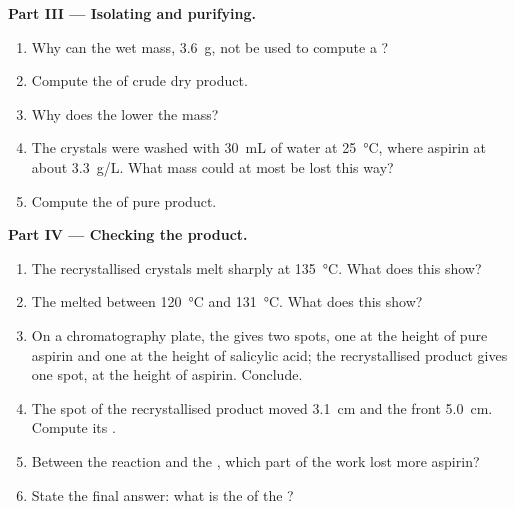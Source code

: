 \begin{problem}
\medskip
\noindent\textbf{Part III --- Isolating and purifying.}
\begin{enumerate}[resume]
  \item Why can the wet mass, \qty{3.6}{g}, not be used to compute a
        ?
  \item Compute the  of crude dry product.
  \item Why does the  lower the mass?
  \item The crystals were washed with \qty{30}{mL} of water at
        \qty{25}{\celsius}, where aspirin  at about
        \qty{3.3}{g/L}. What mass could at most be lost this way?
  \item Compute the  of pure product.
\end{enumerate}

\medskip
\noindent\textbf{Part IV --- Checking the product.}
\begin{enumerate}[resume]
  \item The recrystallised crystals melt sharply at \qty{135}{\celsius}.
        What does this show?
  \item The  melted between \qty{120}{\celsius} and
        \qty{131}{\celsius}. What does this show?
  \item On a chromatography plate, the  gives two spots,
        one at the height of pure aspirin and one at the height of
        salicylic acid; the recrystallised product gives one spot, at
        the height of aspirin. Conclude.
  \item The spot of the recrystallised product moved \qty{3.1}{cm} and
        the  front \qty{5.0}{cm}. Compute its .
  \item Between the reaction and the , which part of the
        work lost more aspirin?
  \item State the final answer: what is the  of the ?
\end{enumerate}
\end{problem}
